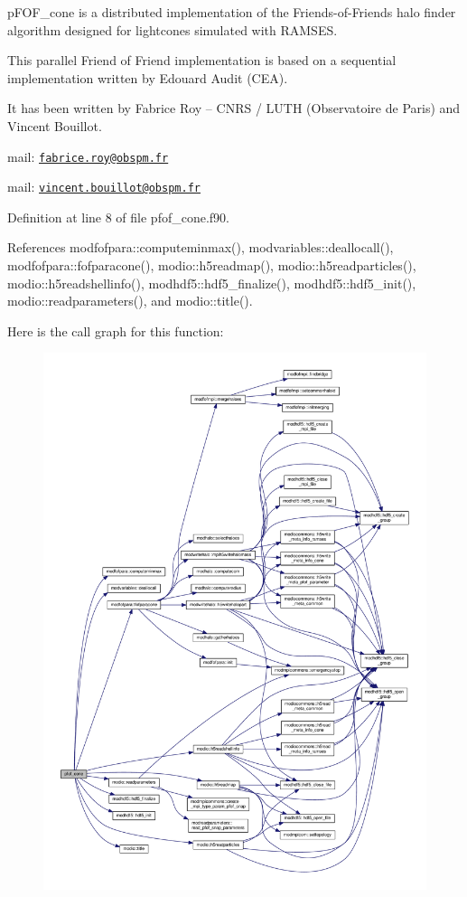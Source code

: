 p\-F\-O\-F\-\_\-cone is a distributed implementation of the Friends-\/of-\/\-Friends halo finder algorithm designed for lightcones simulated with R\-A\-M\-S\-E\-S. \par
 This parallel Friend of Friend implementation is based on a sequential implementation written by Edouard Audit (C\-E\-A). \par
 It has been written by Fabrice Roy -- C\-N\-R\-S / L\-U\-T\-H (Observatoire de Paris) and Vincent Bouillot. \par
 mail\-: \href{mailto:fabrice.roy@obspm.fr}{\tt fabrice.\-roy@obspm.\-fr} \par
 mail\-: \href{mailto:vincent.bouillot@obspm.fr}{\tt vincent.\-bouillot@obspm.\-fr} \par
 



Definition at line 8 of file pfof\-\_\-cone.\-f90.



References modfofpara\-::computeminmax(), modvariables\-::deallocall(), modfofpara\-::fofparacone(), modio\-::h5readmap(), modio\-::h5readparticles(), modio\-::h5readshellinfo(), modhdf5\-::hdf5\-\_\-finalize(), modhdf5\-::hdf5\-\_\-init(), modio\-::readparameters(), and modio\-::title().



Here is the call graph for this function\-:\nopagebreak
\begin{figure}[H]
\begin{center}
\leavevmode
\includegraphics[width=350pt]{pfof__cone_8f90_addc770475dc2e497bf70a10ebc158aed_cgraph}
\end{center}
\end{figure}


